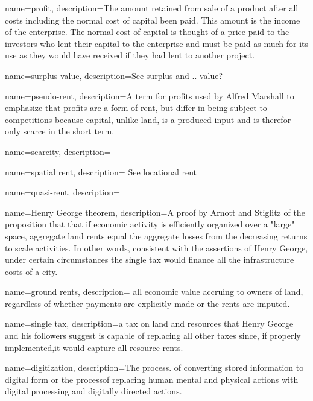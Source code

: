 {
name=profit,
description={The amount retained from sale of a product after all costs including the normal cost of capital  been paid. This amount is the income of the enterprise. The normal cost of capital is thought of a price paid to the investors who lent their capital to the enterprise and must be paid as  much for its use as they would have received if they had lent to another project. }
}

{
name=surplus value,
description={See \gls{surplus} and .. value?}
}

{
name=pseudo-rent,
description={A term for profits used by Alfred Marshall to emphasize that profits are a form of rent, but differ in being subject to competitions  because capital, unlike land, is a produced input and is therefor only scarce in the short term. }
}

{
name=scarcity,
description={}
}

{
name=spatial rent,
description={ See \gls{locational rent}}
}

{
name=quasi-rent,
description={}
}

{
name=Henry George theorem,
description={A proof by Arnott and Stiglitz \cite{arnottAggregateLandRents1979} of the proposition that  that if economic activity is efficiently organized over a "large" space, aggregate land rents equal the aggregate losses from the decreasing returns to scale activities. In other words, consistent with the assertions of Henry George, under certain circumstances the \gls{single tax} would finance all the infrastructure costs of a city. }
}

{
name=ground rents,
description={ all economic value accruing to owners of land, regardless of whether payments are explicitly made or the rents are imputed.}
}

{
name=single tax,
description={a tax on land and resources that Henry George and his followers suggest is capable of replacing all other taxes since, if properly implemented,it would capture all resource rents. }
}

{
name=digitization,
description={The process. of converting stored information to digital form or the processof replacing human mental and physical actions with digital processing and digitally directed actions. }
}

